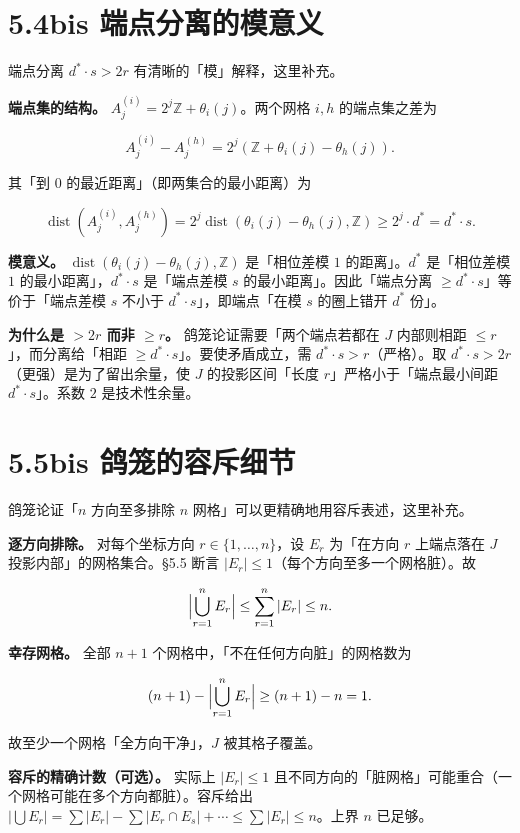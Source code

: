 \documentclass[a4paper,11pt,openany]{ctexbook}
\numberwithin{equation}{chapter}
\numberwithin{figure}{chapter}
\numberwithin{table}{chapter}
\begin{document}
\section{5.4bis 端点分离的模意义}

端点分离 $d^*\cdot s>2r$ 有清晰的「模」解释，这里补充。

\textbf{端点集的结构。} $A_j^{(i)}=2^j\mathbb Z+\theta_i(j)$。两个网格 $i,h$ 的端点集之差为

$$A_j^{(i)}-A_j^{(h)}=2^j(\mathbb Z+\theta_i(j)-\theta_h(j)).$$

其「到 $0$ 的最近距离」（即两集合的最小距离）为

$$\operatorname{dist}(A_j^{(i)},A_j^{(h)})=2^j\operatorname{dist}(\theta_i(j)-\theta_h(j),\mathbb Z)\ge2^j\cdot d^*=d^*\cdot s.$$

\textbf{模意义。} $\operatorname{dist}(\theta_i(j)-\theta_h(j),\mathbb Z)$ 是「相位差模 $1$ 的距离」。$d^*$ 是「相位差模 $1$ 的最小距离」，$d^*\cdot s$ 是「端点差模 $s$ 的最小距离」。因此「端点分离 $\ge d^*\cdot s$」等价于「端点差模 $s$ 不小于 $d^*\cdot s$」，即端点「在模 $s$ 的圈上错开 $d^*$ 份」。

\textbf{为什么是 $>2r$ 而非 $\ge r$。} 鸽笼论证需要「两个端点若都在 $J$ 内部则相距 $\le r$」，而分离给「相距 $\ge d^*\cdot s$」。要使矛盾成立，需 $d^*\cdot s>r$（严格）。取 $d^*\cdot s>2r$（更强）是为了留出余量，使 $J$ 的投影区间「长度 $r$」严格小于「端点最小间距 $d^*\cdot s$」。系数 $2$ 是技术性余量。

\section{5.5bis 鸽笼的容斥细节}

鸽笼论证「$n$ 方向至多排除 $n$ 网格」可以更精确地用容斥表述，这里补充。

\textbf{逐方向排除。} 对每个坐标方向 $r\in\{1,\dots,n\}$，设 $E_r$ 为「在方向 $r$ 上端点落在 $J$ 投影内部」的网格集合。§5.5 断言 $|E_r|\le1$（每个方向至多一个网格脏）。故

$$\Bigl|\bigcup_{r=1}^n E_r\Bigr|\le\sum_{r=1}^n|E_r|\le n.$$

\textbf{幸存网格。} 全部 $n+1$ 个网格中，「不在任何方向脏」的网格数为

$$(n+1)-\Bigl|\bigcup_{r=1}^n E_r\Bigr|\ge(n+1)-n=1.$$

故至少一个网格「全方向干净」，$J$ 被其格子覆盖。

\textbf{容斥的精确计数（可选）。} 实际上 $|E_r|\le1$ 且不同方向的「脏网格」可能重合（一个网格可能在多个方向都脏）。容斥给出 $|\bigcup E_r|=\sum|E_r|-\sum|E_r\cap E_s|+\cdots\le\sum|E_r|\le n$。上界 $n$ 已足够。
\end{document}
